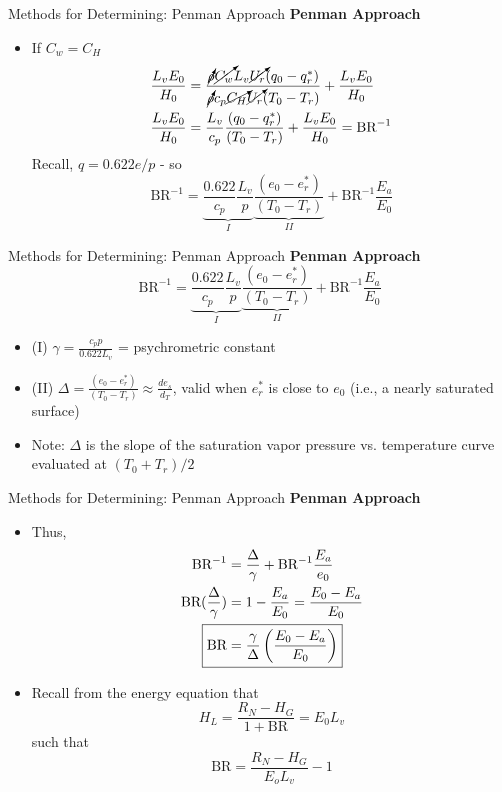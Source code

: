 \begin{frame}{Methods for Determining: Penman Approach}
\textbf{Penman Approach}
\begin{itemize}
	\item If $C_w=C_H$
	\begin{align*}
	\frac{L_v E_0}{H_0} &= \frac{\cancelto{}{\rho} \cancelto{}{C_w} L_v \cancelto{}{U_r}(q_0 - q_r^*)}{\cancelto{}{\rho} c_p \cancelto{}{C_H} \cancelto{}{U_r}(T_0 - T_r)} + \frac{L_v E_0}{H_0}\\
	\frac{L_v E_0}{H_0} &= \frac{L_v}{c_p} \frac{(q_0 - q_r^*)}{(T_0 - T_r)} + \frac{L_v E_0}{H_0} = \text{BR}^{-1}
	\end{align*}
	Recall, $q = 0.622 e/p$ - so
	$$\text{BR}^{-1} = \underbrace{\frac{0.622}{c_p}\frac{L_v}{p}}_{I} \underbrace{\frac{(e_0 - e_r^*)}{(T_0 - T_r)}}_{II} + \text{BR}^{-1}\frac{E_a}{E_0}$$
\end{itemize}
\end{frame}


\begin{frame}{Methods for Determining: Penman Approach}
\textbf{Penman Approach}
$$\text{BR}^{-1} = \underbrace{\frac{0.622}{c_p}\frac{L_v}{p}}_{I} \underbrace{\frac{(e_0 - e_r^*)}{(T_0 - T_r)}}_{II} + \text{BR}^{-1}\frac{E_a}{E_0}$$
\begin{itemize}
	\item (I) $\gamma = \frac{c_p p}{0.622 L_v}$ = psychrometric constant
	\item (II) $\Delta = \frac{(e_0 - e_r^*)}{(T_0 - T_r)} \approx \frac{d e_s}{d_T}$, valid when $e_r^*$ is close to $e_0$ (i.e., a nearly saturated surface)
	\item Note: $\Delta$ is the slope of the saturation vapor pressure vs. temperature curve evaluated at $(T_0 + T_r)/2$
\end{itemize}
\end{frame}


\begin{frame}{Methods for Determining: Penman Approach}
\textbf{Penman Approach}
\begin{itemize}
	\item Thus, 
	\begin{align*}
	\text{BR}^{-1} &= \frac{\Delta}{\gamma} + \text{BR}^{-1}\frac{E_a}{e_0}\\
	\text{BR}(\frac{\Delta}{\gamma}) &= 1-\frac{E_a}{E_0} = \frac{E_0-E_a}{E_0}\\
	\Aboxed{\text{BR} &= \frac{\gamma}{\Delta}\left(\frac{E_0-E_a}{E_0}\right)}
	\end{align*}
	\item Recall from the energy equation that
	$$H_L = \frac{R_N - H_G}{1 + \text{BR}} = E_0 L_v$$
	such that 
	$$\text{BR} = \frac{R_N - H_G}{E_o L_v} -1$$ 
\end{itemize}
\end{frame}

